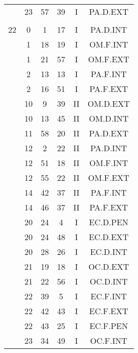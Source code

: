 \documentclass[12pt, a4paper]{article}
\begin{document}
\begin{multicols}{3}
{\begin{tabular}{c c c c c c}
	 	 	 	 & 23 & 57 & 39 & I & PA.D.EXT\\%
	 	 	 	 & & & & & \\%
	 	 	 	22 & 0 & 1 & 17 & I & PA.D.INT\\%
	 	 	 	 & 1 & 18 & 19 & I & OM.F.INT\\%
	 	 	 	 & 1 & 21 & 57 & I & OM.F.EXT\\%
	 	 	 	 & 2 & 13 & 13 & I & PA.F.INT\\%
	 	 	 	 & 2 & 16 & 51 & I & PA.F.EXT\\%
	 	 	 	 & 10 & 9 & 39 & II & OM.D.EXT\\%
	 	 	 	 & 10 & 13 & 45 & II & OM.D.INT\\%
	 	 	 	 & 11 & 58 & 20 & II & PA.D.EXT\\%
	 	 	 	 & 12 & 2 & 22 & II & PA.D.INT\\%
	 	 	 	 & 12 & 51 & 18 & II & OM.F.INT\\%
	 	 	 	 & 12 & 55 & 22 & II & OM.F.EXT\\%
	 	 	 	 & 14 & 42 & 37 & II & PA.F.INT\\%
	 	 	 	 & 14 & 46 & 37 & II & PA.F.EXT\\%
	 	 	 	 & 20 & 24 & 4 & I & EC.D.PEN\\%
	 	 	 	 & 20 & 24 & 48 & I & EC.D.EXT\\%
	 	 	 	 & 20 & 28 & 26 & I & EC.D.INT\\%
	 	 	 	 & 21 & 19 & 18 & I & OC.D.EXT\\%
	 	 	 	 & 21 & 22 & 56 & I & OC.D.INT\\%
	 	 	 	 & 22 & 39 & 5 & I & EC.F.INT\\%
	 	 	 	 & 22 & 42 & 43 & I & EC.F.EXT\\%
	 	 	 	 & 22 & 43 & 25 & I & EC.F.PEN\\%
	 	 	 	 & 23 & 34 & 49 & I & OC.F.INT\\%
	 	 \end{tabular}
 	}
\end{multicols}
\end{document}
